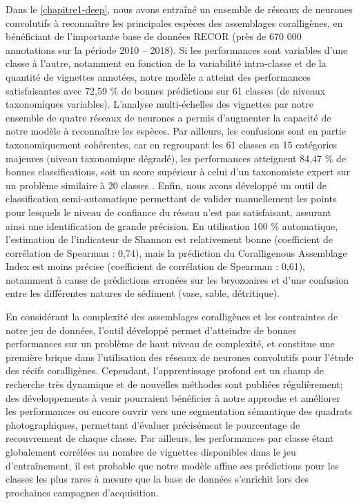 Dans le \autoref{chapitre1-deep}, nous avons entraîné un ensemble de réseaux de neurones convolutifs à reconnaître les principales espèces des assemblages coralligènes, en bénéficiant de l’importante base de données RECOR (près de 670 000 annotations sur la période 2010 – 2018). Si les performances sont variables d’une classe à l’autre, notamment en fonction de la variabilité intra-classe et de la quantité de vignettes annotées, notre modèle a atteint des performances satisfaisantes avec 72,59 \% de bonnes prédictions sur 61 classes (de niveaux taxonomiques variables). L’analyse multi-échelles des vignettes par notre ensemble de quatre réseaux de neurones a permis d’augmenter la capacité de notre modèle à reconnaître les espèces. Par ailleurs, les confusions sont en partie taxonomiquement cohérentes, car en regroupant les 61 classes en 15 catégories majeures (niveau taxonomique dégradé), les performances atteignent 84,47 \% de bonnes classifications, soit un score supérieur à celui d’un taxonomiste expert sur un problème similaire à 20 classes \citep{beijbom_towards_2015}. Enfin, nous avons développé un outil de classification semi-automatique permettant de valider manuellement les points pour lesquels le niveau de confiance du réseau n’est pas satisfaisant, assurant ainsi une identification de grande précision. En utilisation 100 \% automatique, l’estimation de l’indicateur de Shannon est relativement bonne (coefficient de corrélation de Spearman : 0,74), mais la prédiction du Coralligenous Assemblage Index \citep{deter_preliminary_2012} est moins précise (coefficient de corrélation de Spearman : 0,61), notamment à cause de prédictions erronées sur les bryozoaires et d’une confusion entre les différentes natures de sédiment (vase, sable, détritique).

En considérant la complexité des assemblages coralligènes et les contraintes de notre jeu de données, l’outil développé permet d’atteindre de bonnes performances sur un problème de haut niveau de complexité, et constitue une première brique dans l’utilisation des réseaux de neurones convolutifs pour l’étude des récifs coralligènes. Cependant, l’apprentissage profond est un champ de recherche très dynamique et de nouvelles méthodes sont publiées régulièrement; des développements à venir pourraient bénéficier à notre approche et améliorer les performances ou encore ouvrir vers une segmentation sémantique des quadrats photographiques, permettant d’évaluer précisément le pourcentage de recouvrement de chaque classe. Par ailleurs, les performances par classe étant globalement corrélées au nombre de vignettes disponibles dans le jeu d’entraînement, il est probable que notre modèle affine ses prédictions pour les classes les plus rares à mesure que la base de données s’enrichit lors des prochaines campagnes d’acquisition.

